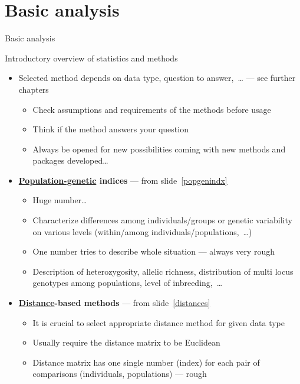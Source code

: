 \documentclass[compress, xelatex, 11pt, xcolor=svgnames, aspectratio=169, url={hyphens, lowtilde}]{beamer}
\begin{document}
\section{Basic analysis}

\begin{frame}{Basic analysis}
	\tableofcontents[currentsection, sectionstyle=show/hide, hideothersubsections]
\end{frame}

\begin{frame}[allowframebreaks]{Introductory overview of statistics and methods}
	\begin{itemize}
		\item \alert{Selected method depends on data type, question to answer,~\ldots}{ }--- see further chapters
		\begin{itemize}
			\item Check assumptions and requirements of the methods before usage
			\item Think if the method answers your question
			\item Always be opened for new possibilities coming with new methods and packages developed\ldots
		\end{itemize}
		\item \textbf{\href{https://en.wikipedia.org/wiki/Population_genetics}{Population-genetic} indices} --- from slide~\ref{popgenindx}
		\begin{itemize}
			\item Huge number\ldots
			\item Characterize differences among individuals/groups or genetic variability on various levels (within/among individuals/populations,~\ldots)
			\item One number tries to describe whole situation --- always very rough
			\item Description of heterozygosity, allelic richness, distribution of multi locus genotypes among populations, level of inbreeding,~\ldots
		\end{itemize}
		\item \textbf{\href{https://en.wikipedia.org/wiki/Genetic_distance}{Distance}-based methods} --- from slide~\ref{distances}
		\begin{itemize}
			\item \alert{It is crucial to select appropriate distance method for given data type}
			\item Usually require the distance matrix to be Euclidean
			\item Distance matrix has one single number (index) for each pair of comparisons (individuals, populations) --- rough

\end{itemize}
\end{itemize}
\end{frame}
\end{document}
